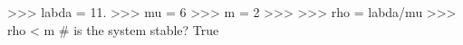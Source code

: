 
>>> labda = 11.
>>> mu = 6
>>> m = 2
>>>
>>> rho = labda/mu
>>> rho < m  # is the system stable?
True

